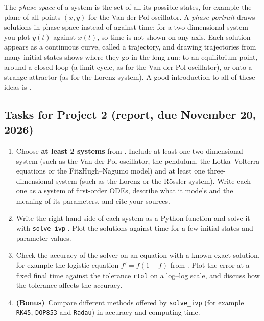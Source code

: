 \documentclass[11pt,a4paper]{article}
\newcommand{\bonus}{\textbf{(Bonus)}}
\begin{document}
The \emph{phase space} of a system is the set of all its possible states, for
example the plane of all points $(x, y)$ for the Van der Pol oscillator. A
\emph{phase portrait} draws solutions in phase space instead of against time:
for a two-dimensional system you plot $y(t)$ against $x(t)$, so time is not
shown on any axis. Each solution appears as a continuous curve, called a
trajectory, and drawing trajectories from many initial states shows
where they go in the long run: to an equilibrium point, around a closed loop
(a limit cycle, as for the Van der Pol oscillator), or onto a strange
attractor (as for the Lorenz system). A good introduction to all of these
ideas is \cite{strogatz}.

\subsection*{Tasks for Project 2 (report, due November 20, 2026)}
\begin{enumerate}
  \item Choose \textbf{at least 2 systems} from \cite{list}. Include at least
        one two-dimensional system (such as the Van der Pol oscillator, the
        pendulum, the Lotka--Volterra equations or the FitzHugh--Nagumo model)
        and at least one three-dimensional system (such as the Lorenz or the
        R\"ossler system). Write each one as a system of first-order ODEs,
        describe what it models and the meaning of its parameters, and cite
        your sources.
  \item Write the right-hand side of each system as a Python function and
        solve it with \texttt{solve\_ivp} \cite{scipy}. Plot the solutions
        against time for a few initial states and parameter values.
  \item Check the accuracy of the solver on an equation with a known exact
        solution, for example the logistic equation $f' = f(1 - f)$ from
        \cite{list}. Plot the error at a fixed final time against the
        tolerance \texttt{rtol} on a log--log scale, and discuss how the
        tolerance affects the accuracy.
  \item \bonus\ Compare different methods offered by \texttt{solve\_ivp}
        (for example \texttt{RK45}, \texttt{DOP853} and \texttt{Radau}) in
        accuracy and computing time.
\end{enumerate}
\end{document}
